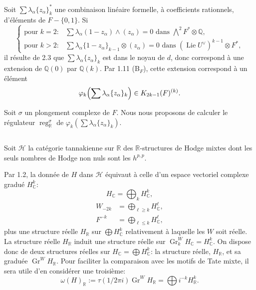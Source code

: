 \documentclass[12pt,a4paper]{article}
\theoremstyle{plain}
\theoremstyle{definition}
\theoremstyle{remark}
\DeclareMathOperator{\reg}{reg}
\DeclareMathOperator{\Lie}{Lie}
\newcommand{\Q}{\mathbb{Q}}
\newcommand{\R}{\mathbb{R}}
\newcommand{\C}{\mathbb{C}}
\begin{document}
Soit $\sum\lambda_\alpha\{z_\alpha\}_k^*$ une combinaison lin{\'e}aire formelle, {\`a} coefficients rationnels, d'{\'e}l{\'e}ments de $F-\{0,1\}$. Si
\begin{equation*}
\begin{cases}
\text{pour }k=2: & \sum\lambda_\alpha(1-z_\alpha)\wedge(z_\alpha)=0\text{ dans }\bigwedge^2F^*\otimes\Q,\\[0.5ex]
\text{pour }k>2: & \sum\lambda_\alpha\{1-z_\alpha\}_{k-1}\otimes(z_\alpha)=0\text{ dans }(\Lie U^\vee)^{k-1}\otimes F^*,
\end{cases}
\end{equation*}
il r{\'e}sulte de 2.3 que $\sum\lambda_\alpha\{z_\alpha\}_k$ est dans le noyau de $d$, donc correspond {\`a} une extension de $\Q(0)$ par $\Q(k)$. Par 1.11 (B$_F$), cette extension correspond {\`a} un {\'e}l{\'e}ment
\begin{equation*}
\varphi_k\Bigl(\sum\lambda_\alpha\{z_\alpha\}_k\Bigr)\in K_{2k-1}(F)^{(k)}.
\end{equation*}

Soit $\sigma$ un plongement complexe de $F$. Nous nous proposons de calculer le r{\'e}gulateur $\reg_\R^\sigma$ de $\varphi_k(\sum\lambda_\alpha\{z_\alpha\}_k)$.

\subsection{}

Soit $\mathscr{H}$ la cat{\'e}gorie tannakienne sur $\R$ des $\R$-structures de Hodge mixtes dont les seuls nombres de Hodge non nuls sont les $h^{p,p}$.

Par 1.2, la donn{\'e}e de $H$ dans $\mathscr{H}$ {\'e}quivaut {\`a} celle d'un espace vectoriel complexe gradu{\'e} $H_\C^k$:
\begin{equation*}
H_\C = \bigoplus_k H_\C^k,
\end{equation*}
\begin{align*}
W_{-2k} &= \bigoplus_{\ell\geq k}H_\C^\ell,\\
F^{-k} &= \bigoplus_{\ell\leq k}H_\C^\ell,
\end{align*}
plus une structure r{\'e}elle $H_\R$ sur $\bigoplus H_\C^k$ relativement {\`a} laquelle les $W$ soit r{\'e}elle. La structure r{\'e}elle $H_\R$ induit une structure r{\'e}elle sur $\operatorname{Gr}^W_k H_\C = H_\C^k$. On dispose donc de deux structures r{\'e}elles sur $H_\C=\bigoplus H_\C^k$: la structure r{\'e}elle, $H_\R$, et sa gradu{\'e}e $\operatorname{Gr}^W H_\R$. Pour faciliter la comparaison avec les motifs de Tate mixte, il sera utile d'en consid{\'e}rer une troisi{\`e}me:
\begin{equation*}
\omega(H)_\R := \tau(1/2\pi i)\operatorname{Gr}^W H_\R = \bigoplus i^{-k}H_\R^k.
\end{equation*}
\end{document}
